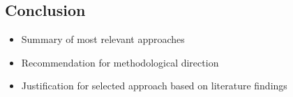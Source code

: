 \subsection{Conclusion}
\begin{itemize}
    \item Summary of most relevant approaches
    \item Recommendation for methodological direction
    \item Justification for selected approach based on literature findings
\end{itemize}